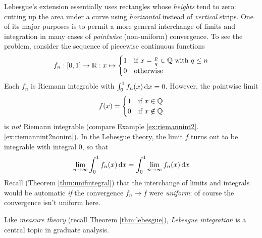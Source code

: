 Lebesgue's extension essentially uses rectangles whose \emph{heights} tend to zero: cutting up the area under a curve using \emph{horizontal} instead of \emph{vertical} strips. One of its major purposes is to permit a more general interchange of limits and integration in many cases of \emph{pointwise} (non-uniform) convergence.
To see the problem, consider the sequence of piecewise continuous functions
\[
	f_n:[0,1]\to\mathbb{R}:x\mapsto
	\begin{cases}
		1&\text{if }x=\frac pq\in\mathbb{Q}\text{ with }q\le n\\
		0&\text{otherwise}
	\end{cases}
\]
Each $f_n$ is Riemann integrable with $\int_0^1f_n(x)\,{\mathrm{d} x}=0$. However, the pointwise limit
\[
	f(x)=
	\begin{cases}
		1&\text{if }x\in\mathbb{Q}\\
		0&\text{if }x\not\in\mathbb{Q}
	\end{cases}
\]
is \emph{not} Riemann integrable (compare Example \ref*{ex:riemannint2}.\ref{ex:riemannint2nonint}). In the Lebesgue theory, the limit $f$ turns out to be integrable with integral 0, so that
\[
	\lim_{n\to\infty}\int_0^1f_n(x)\,{\mathrm{d} x}=\int_0^1\lim_{n\to\infty}f_n(x)\,{\mathrm{d} x}
\]
Recall (Theorem \ref{thm:unifintegral}) that the interchange of limits and integrals would be automatic \emph{if} the convergence $f_n\to f$ were \emph{uniform}: of course the convergence isn't uniform here.\smallbreak

Like \emph{measure theory} (recall Theorem \ref{thm:lebesgue}), \emph{Lebesgue integration} is a central topic in graduate analysis.